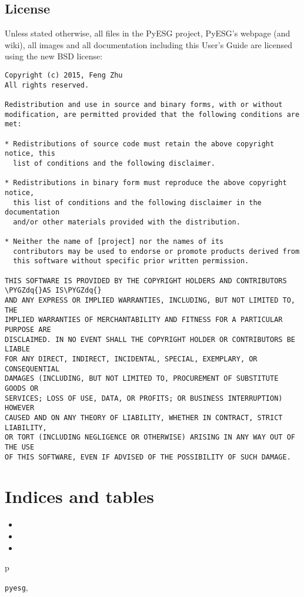 \documentclass[letterpaper,10pt,english]{sphinxmanual}
\def\PYGZdq{\char`\"}
\begin{document}
\section{License}
\label{about:license}
Unless stated otherwise, all files in the PyESG project, PyESG’s webpage (and wiki),
all images and all documentation including this User’s Guide are licensed using the
new BSD license:

\begin{Verbatim}[commandchars=\\\{\}]
Copyright (c) 2015, Feng Zhu
All rights reserved.

Redistribution and use in source and binary forms, with or without
modification, are permitted provided that the following conditions are met:

* Redistributions of source code must retain the above copyright notice, this
  list of conditions and the following disclaimer.

* Redistributions in binary form must reproduce the above copyright notice,
  this list of conditions and the following disclaimer in the documentation
  and/or other materials provided with the distribution.

* Neither the name of [project] nor the names of its
  contributors may be used to endorse or promote products derived from
  this software without specific prior written permission.

THIS SOFTWARE IS PROVIDED BY THE COPYRIGHT HOLDERS AND CONTRIBUTORS \PYGZdq{}AS IS\PYGZdq{}
AND ANY EXPRESS OR IMPLIED WARRANTIES, INCLUDING, BUT NOT LIMITED TO, THE
IMPLIED WARRANTIES OF MERCHANTABILITY AND FITNESS FOR A PARTICULAR PURPOSE ARE
DISCLAIMED. IN NO EVENT SHALL THE COPYRIGHT HOLDER OR CONTRIBUTORS BE LIABLE
FOR ANY DIRECT, INDIRECT, INCIDENTAL, SPECIAL, EXEMPLARY, OR CONSEQUENTIAL
DAMAGES (INCLUDING, BUT NOT LIMITED TO, PROCUREMENT OF SUBSTITUTE GOODS OR
SERVICES; LOSS OF USE, DATA, OR PROFITS; OR BUSINESS INTERRUPTION) HOWEVER
CAUSED AND ON ANY THEORY OF LIABILITY, WHETHER IN CONTRACT, STRICT LIABILITY,
OR TORT (INCLUDING NEGLIGENCE OR OTHERWISE) ARISING IN ANY WAY OUT OF THE USE
OF THIS SOFTWARE, EVEN IF ADVISED OF THE POSSIBILITY OF SUCH DAMAGE.
\end{Verbatim}


\chapter{Indices and tables}
\label{index:indices-and-tables}\begin{itemize}
\item {} 

\item {} 

\item {} 

\end{itemize}


\renewcommand{\indexname}{Python Module Index}
\begin{theindex}
\def\bigletter#1{{\Large\sffamily#1}\nopagebreak\vspace{1mm}}
\bigletter{p}
\item {\texttt{pyesg}}, \pageref{code:module-pyesg}
\end{theindex}

\renewcommand{\indexname}{Index}
\printindex
\end{document}
